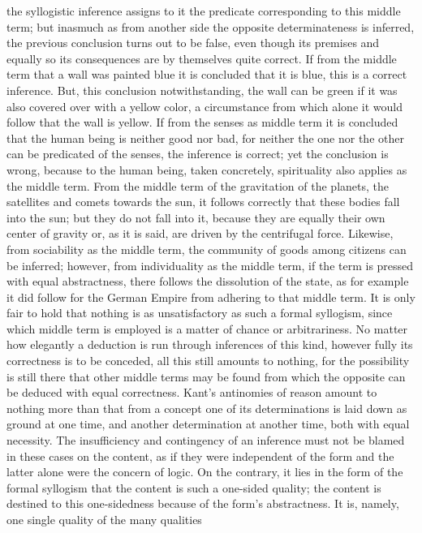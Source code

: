the syllogistic inference assigns to it the predicate
corresponding to this middle term;
but inasmuch as from another side the
opposite determinateness is inferred,
the previous conclusion turns out to be false,
even though its premises and equally so its consequences
are by themselves quite correct.
If from the middle term that a wall was painted blue
it is concluded that it is blue,
this is a correct inference.
But, this conclusion notwithstanding,
the wall can be green if it was
also covered over with a yellow color,
a circumstance from which alone it would follow that the wall is yellow.
If from the senses as middle term it is concluded that
the human being is neither good nor bad,
for neither the one nor the other can be predicated of the senses,
the inference is correct;
yet the conclusion is wrong,
because to the human being, taken concretely,
spirituality also applies as the middle term.
From the middle term of the gravitation of the planets,
the satellites and comets towards the sun,
it follows correctly that these bodies fall into the sun;
but they do not fall into it,
because they are equally their own center of gravity
or, as it is said, are driven by the centrifugal force.
Likewise, from sociability as the middle term,
the community of goods among citizens can be inferred;
however, from individuality as the middle term,
if the term is pressed with equal abstractness,
there follows the dissolution of the state,
as for example it did follow for the German Empire
from adhering to that middle term.
It is only fair to hold that nothing is
as unsatisfactory as such a formal syllogism,
since which middle term is employed is
a matter of chance or arbitrariness.
No matter how elegantly a deduction is
run through inferences of this kind,
however fully its correctness is to be conceded,
all this still amounts to nothing,
for the possibility is still there
that other middle terms may be found
from which the opposite can be deduced with equal correctness.
Kant's antinomies of reason amount to nothing more than that
from a concept one of its determinations is
laid down as ground at one time,
and another determination at another time,
both with equal necessity.
The insufficiency and contingency of an inference
must not be blamed in these cases on the content,
as if they were independent of the form
and the latter alone were the concern of logic.
On the contrary, it lies in the form of the formal syllogism
that the content is such a one-sided quality;
the content is destined to this one-sidedness
because of the form's abstractness.
It is, namely, one single quality of the many qualities
